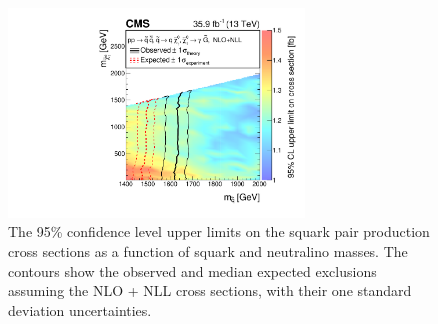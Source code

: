 \begin{figure}[h]
\begin{center}
\includegraphics[width=0.7\textwidth]{Figures/Results/T6ggXSEC.pdf}
\end{center}
    \caption{The 95\% confidence level upper limits on the squark pair
        production cross sections as a function of squark and neutralino masses.
        The contours show the observed and median expected exclusions assuming
        the NLO + NLL cross sections, with their one standard deviation
	uncertainties.}
    \label{fig:limit_T6gg}
\end{figure}

